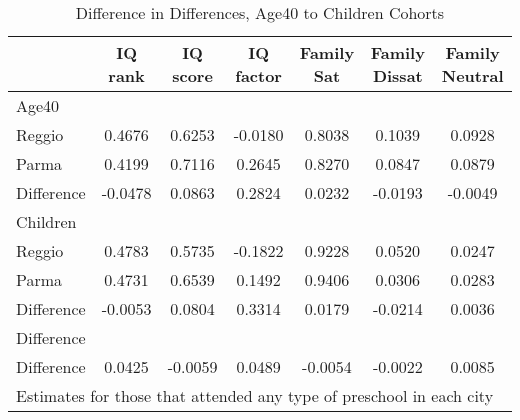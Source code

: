 \begin{table}[htbp]\centering
\caption{Difference in Differences, Age40 to Children Cohorts}
\begin{tabular}{l*{6}{c}}
\hline\hline
            &     IQ rank&    IQ score&   IQ factor&  Family Sat&Family Dissat&Family Neutral\\
\hline
Age40       &            &            &            &            &            &            \\
Reggio      &      0.4676&      0.6253&     -0.0180&      0.8038&      0.1039&      0.0928\\
Parma       &      0.4199&      0.7116&      0.2645&      0.8270&      0.0847&      0.0879\\
Difference  &     -0.0478&      0.0863&      0.2824&      0.0232&     -0.0193&     -0.0049\\
\hline
Children    &            &            &            &            &            &            \\
Reggio      &      0.4783&      0.5735&     -0.1822&      0.9228&      0.0520&      0.0247\\
Parma       &      0.4731&      0.6539&      0.1492&      0.9406&      0.0306&      0.0283\\
Difference  &     -0.0053&      0.0804&      0.3314&      0.0179&     -0.0214&      0.0036\\
\hline
Difference  &            &            &            &            &            &            \\
Difference  &      0.0425&     -0.0059&      0.0489&     -0.0054&     -0.0022&      0.0085\\
\hline\hline
\multicolumn{7}{l}{\footnotesize Estimates for those that attended any type of preschool in each city}\\
\end{tabular}
\end{table}
